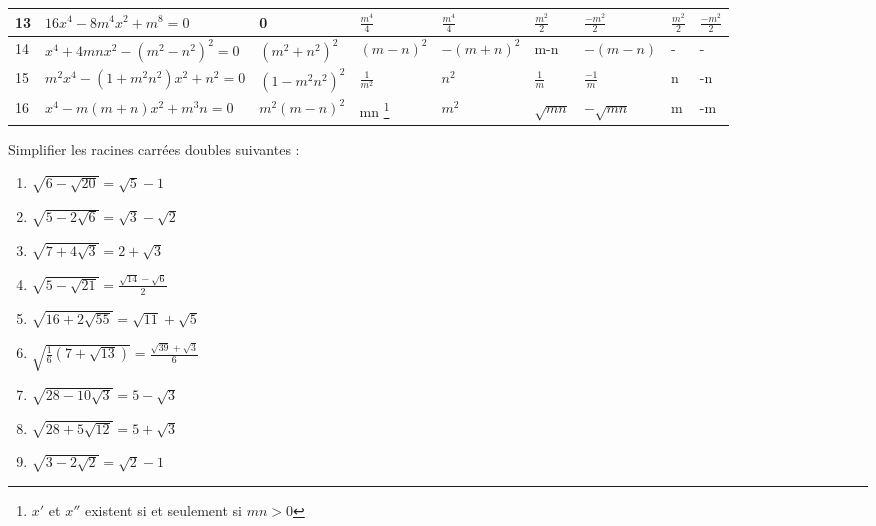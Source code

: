 \begin{landscape}
\begin{solution}
\begin{tabular}{|l|l|l|l|l|l|l|l|l|}
13 & $16{{x}^{4}}-8{{m}^{4}}{{x}^{2}}+{{m}^{8}}=0$                                 & 0                                             & $\frac{{{m}^{4}}}{4}$                                            & $\frac{{{m}^{4}}}{4}$         & $\frac{{{m}^{2}}}{2}$ & $\frac{-{{m}^{2}}}{2}$ & $\frac{{{m}^{2}}}{2}$ & $\frac{-{{m}^{2}}}{2}$ \\ \hline
14 & ${{x}^{4}}+4mn{{x}^{2}}-{{({{m}^{2}}-{{n}^{2}})}^{2}}=0$                      & ${{\left( {{m}^{2}}+{{n}^{2}} \right)}^{2}}$  & ${{\left( m-n \right)}^{2}}$                                     & $-{{\left( m+n \right)}^{2}}$ & m-n                   & $-\left( m-n \right)$  & -                     & -                      \\ \hline
15 & ${{m}^{2}}{{x}^{4}}-\left( 1+{{m}^{2}}{{n}^{2}} \right){{x}^{2}}+{{n}^{2}}=0$ & ${{\left( 1-{{m}^{2}}{{n}^{2}} \right)}^{2}}$ & $\frac{1}{{{m}^{2}}}$                                            & ${{n}^{2}}$                   & $\frac{1}{m}$         & $\frac{-1}{m}$         & n                     & -n                     \\ \hline
16 & ${{x}^{4}}-m\left( m+n \right){{x}^{2}}+{{m}^{3}}n=0$                         & ${{m}^{2}}{{\left( m-n \right)}^{2}}$         & mn \footnote{${x}'$ et ${x}''$ existent si et seulement si $mn > 0$} & ${{m}^{2}}$                   & $\sqrt{mn}$           & $-\sqrt{mn}$           & m                     & -m                     \\ \hline
\end{tabular}
\end{solution}

\begin{solution}
Simplifier les racines carrées doubles suivantes :

\begin{enumerate}
\item $\sqrt{6-\sqrt{20}}=\sqrt{5}-1$
\item $\sqrt{5-2\sqrt{6}}=\sqrt{3}-\sqrt{2}$
\item $\sqrt{7+4\sqrt{3}}=2+\sqrt{3}$
\item $\sqrt{5-\sqrt{21}}=\frac{\sqrt{14}-\sqrt{6}}{2}$
\item $\sqrt{16+2\sqrt{55}}=\sqrt{11}+\sqrt{5}$
\item $\sqrt{\frac{1}{6}\left( 7+\sqrt{13} \right)}=\frac{\sqrt{39}+\sqrt{3}}{6}$
\item $\sqrt{28-10\sqrt{3}}=5-\sqrt{3}$
\item $\sqrt{28+5\sqrt{12}}=5+\sqrt{3}$
\item $\sqrt{3-2\sqrt{2}}=\sqrt{2}-1$
\end{enumerate}
\end{solution}


\end{landscape}
